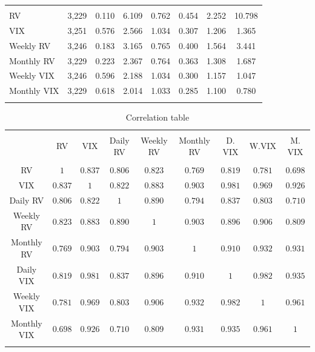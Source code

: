 \begin{table}[!htbp]
\begin{tabular}{@{\extracolsep{5pt}}lccccccc}
\hline \\[-1.8ex] 
RV & 3,229 & 0.110 & 6.109 & 0.762 & 0.454 & 2.252  & 10.798\\ 
VIX & 3,251 & 0.576 & 2.566 & 1.034 & 0.307 & 1.206 & 1.365\\ 
Weekly RV & 3,246 & 0.183 & 3.165 & 0.765 & 0.400  &  1.564  & 3.441 \\ 
Monthly RV & 3,229 & 0.223 & 2.367 & 0.764 & 0.363  & 1.308 & 1.687\\ 
Weekly VIX & 3,246 & 0.596 & 2.188 & 1.034 & 0.300  & 1.157 & 1.047\\ 
Monthly VIX & 3,229 & 0.618 & 2.014 & 1.033 & 0.285 & 1.100 & 0.780 \\ 
\hline \\[-1.8ex] 
\end{tabular} 
\end{table} 

\begin{table}[!htbp] \centering 
  \caption{Correlation table} 
  \label{tab:correlation} 
\begin{tabular}{@{\extracolsep{5pt}} ccccccccc} 
\\[-1.8ex]\hline 
\hline \\[-1.8ex] 
 & RV & VIX & Daily RV & Weekly RV & Monthly RV & D. VIX & W.VIX & M. VIX \\ 
\hline \\[-1.8ex] 
RV & $1$ & $0.837$ & $0.806$ & $0.823$ & $0.769$ & $0.819$ & $0.781$ & $0.698$ \\ 
VIX & $0.837$ & $1$ & $0.822$ & $0.883$ & $0.903$ & $0.981$ & $0.969$ & $0.926$ \\ 
Daily RV & $0.806$ & $0.822$ & $1$ & $0.890$ & $0.794$ & $0.837$ & $0.803$ & $0.710$ \\ 
Weekly RV & $0.823$ & $0.883$ & $0.890$ & $1$ & $0.903$ & $0.896$ & $0.906$ & $0.809$ \\ 
Monthly RV & $0.769$ & $0.903$ & $0.794$ & $0.903$ & $1$ & $0.910$ & $0.932$ & $0.931$ \\ 
Daily VIX & $0.819$ & $0.981$ & $0.837$ & $0.896$ & $0.910$ & $1$ & $0.982$ & $0.935$ \\ 
Weekly VIX & $0.781$ & $0.969$ & $0.803$ & $0.906$ & $0.932$ & $0.982$ & $1$ & $0.961$ \\ 
Monthly VIX & $0.698$ & $0.926$ & $0.710$ & $0.809$ & $0.931$ & $0.935$ & $0.961$ & $1$ \\ 
\hline \\[-1.8ex] 
\end{tabular} 
\end{table} 

